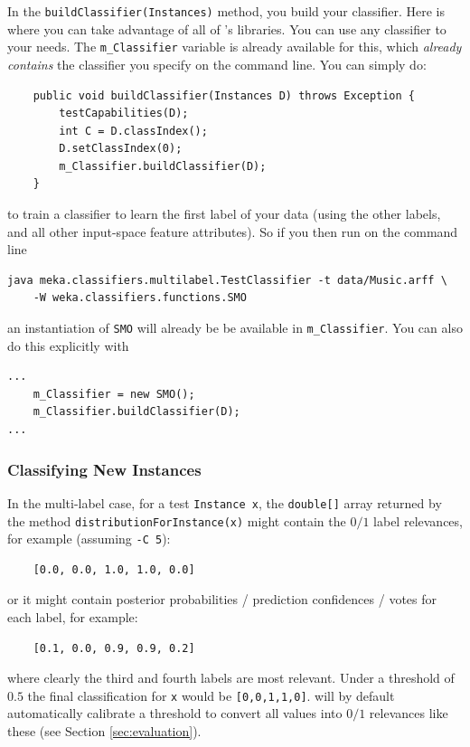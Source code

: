 \documentclass[11pt]{article}
\newcommand{\MEKA}{Meka}
\newcommand{\WEKA}{Weka}
\begin{document}
In the \texttt{buildClassifier(Instances)} method, you build your classifier. Here is where you can take advantage of all of \framework{\WEKA}'s libraries. You can use any \framework{\WEKA} classifier to your needs. The \texttt{m\_Classifier} variable is already available for this, which \textit{already contains} the \framework{\WEKA} classifier you specify on the command line. You can simply do:
{
\lstset{basicstyle=\small\ttfamily,breaklines=true,language=java,frame=L,xleftmargin=\parindent}
\begin{lstlisting}
    public void buildClassifier(Instances D) throws Exception {
        testCapabilities(D);
        int C = D.classIndex();
        D.setClassIndex(0);
        m_Classifier.buildClassifier(D);
    }
\end{lstlisting}
}
to train a classifier to learn the first label of your data (using the other labels, and all other input-space feature attributes). So if you then run on the command line
{
\lstset{basicstyle=\small\ttfamily,breaklines=true,language=java,frame=L,xleftmargin=\parindent}
\begin{lstlisting}
java meka.classifiers.multilabel.TestClassifier -t data/Music.arff \
	-W weka.classifiers.functions.SMO
\end{lstlisting}
}
an instantiation of \texttt{SMO} will already be be available in \texttt{m\_Classifier}. You can also do this explicitly with
{
\lstset{basicstyle=\small\ttfamily,breaklines=true,language=java,frame=L,xleftmargin=\parindent}
\begin{lstlisting}
...
    m_Classifier = new SMO();
    m_Classifier.buildClassifier(D);
...
\end{lstlisting}
}

\subsubsection{Classifying New Instances}

In the multi-label case, for a test \texttt{Instance x}, the \texttt{double[]} array returned by the method \texttt{distributionForInstance(x)} might contain the $0/1$ label relevances, for example (assuming \texttt{-C 5}):
\begin{lstlisting}
	[0.0, 0.0, 1.0, 1.0, 0.0]
\end{lstlisting} 
or it might contain posterior probabilities / prediction confidences / votes for each label, for example:
\begin{lstlisting}
	[0.1, 0.0, 0.9, 0.9, 0.2]
\end{lstlisting} 
where clearly the third and fourth labels are most relevant. Under a threshold of $0.5$ the final classification for \texttt{x} would be \texttt{[0,0,1,1,0]}. \framework{\MEKA} will by default automatically calibrate a threshold to convert all values into $0/1$ relevances like these (see Section \ref{sec:evaluation}). 
\end{document}
